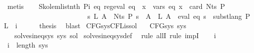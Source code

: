 \begin{isabellebody}
\ metis\isanewline
\ \ \isamarkupfalse%
\ Skolem{\isacharunderscore}{\kern0pt}list{\isacharunderscore}{\kern0pt}nth{\isacharbrackleft}{\kern0pt}\ P{\isacharequal}{\kern0pt}{\isachardoublequoteopen}{\isasymlambda}i\ eq{\isachardot}{\kern0pt}\ reg{\isacharunderscore}{\kern0pt}eval\ eq\ {\isasymand}\ {\isacharparenleft}{\kern0pt}{\isasymforall}x\ {\isasymin}\ vars\ eq{\isachardot}{\kern0pt}\ x\ {\isacharless}{\kern0pt}\ card\ {\isacharparenleft}{\kern0pt}Nts\ P{\isacharparenright}{\kern0pt}{\isacharparenright}{\kern0pt}\isanewline
\ \ \ \ \ \ \ \ \ \ \ \ \ \ \ \ \ \ \ \ \ \ \ {\isasymand}\ {\isacharparenleft}{\kern0pt}{\isasymforall}s\ L{\isachardot}{\kern0pt}\ {\isacharparenleft}{\kern0pt}{\isasymforall}A\ {\isasymin}\ Nts\ P{\isachardot}{\kern0pt}\ s\ {\isacharparenleft}{\kern0pt}{\isasymgamma}{\isacharprime}{\kern0pt}\ A{\isacharparenright}{\kern0pt}\ {\isacharequal}{\kern0pt}\ L\ A{\isacharparenright}{\kern0pt}\ {\isasymlongrightarrow}\ eval\ eq\ s\ {\isacharequal}{\kern0pt}\ subst{\isacharunderscore}{\kern0pt}lang\ P\ L\ {\isacharparenleft}{\kern0pt}{\isasymgamma}\ i{\isacharparenright}{\kern0pt}{\isacharparenright}{\kern0pt}{\isachardoublequoteclose}{\isacharbrackright}{\kern0pt}\isanewline
\ \ \ \ \isamarkupfalse%
\ {\isacharquery}{\kern0pt}thesis\ \isamarkupfalse%
\ blast\isanewline
{}\isamarkupfalse%
%
\endisatagproof
{\isafoldproof}%
%
\isadelimproof
\isanewline
%
\endisadelimproof
\isanewline
{}\isamarkupfalse%
\ CFG{\isacharunderscore}{\kern0pt}sys{\isacharunderscore}{\kern0pt}CFL{\isacharunderscore}{\kern0pt}is{\isacharunderscore}{\kern0pt}sol{\isacharcolon}{\kern0pt}\isanewline
\ \ \ {\isachardoublequoteopen}CFG{\isacharunderscore}{\kern0pt}sys\ sys{\isachardoublequoteclose}\isanewline
\ \ \ {\isachardoublequoteopen}solves{\isacharunderscore}{\kern0pt}ineq{\isacharunderscore}{\kern0pt}sys\ sys\ sol{\isachardoublequoteclose}\isanewline
%
\isadelimproof
%
\endisadelimproof
%
\isatagproof
{}\isamarkupfalse%
\ solves{\isacharunderscore}{\kern0pt}ineq{\isacharunderscore}{\kern0pt}sys{\isacharunderscore}{\kern0pt}def\ \isamarkupfalse%
\ {\isacharparenleft}{\kern0pt}rule\ allI{\isacharcomma}{\kern0pt}\ rule\ impI{\isacharparenright}{\kern0pt}\isanewline
\ \ \isamarkupfalse%
\ i\isanewline
\ \ \isamarkupfalse%
\ {\isachardoublequoteopen}i\ {\isacharless}{\kern0pt}\ length\ sys{\isachardoublequoteclose}\isanewline

\end{isabellebody}
